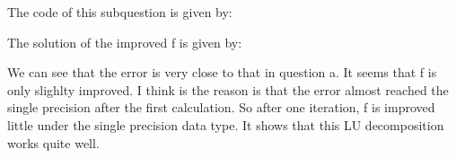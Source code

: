 The code of this subquestion is given by:


The solution of the improved f is given by:


We can see that the error is very close to that in question a. It seems that f is only slighlty improved.
I think is the reason is that the error almost reached the single precision after the first calculation.
So after one iteration, f is improved little under the single precision data type. It shows that this LU decomposition works quite well.
